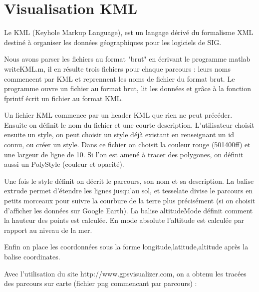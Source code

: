 \documentclass{report}
\begin{document}
\section{Visualisation KML}
Le KML (Keyhole Markup Language), est un langage dérivé du formalisme 
XML destiné à organiser les données géographiques pour les logiciels 
de SIG.

Nous avons parser les fichiers au format "brut" en écrivant le programme
matlab writeKML.m, il en résulte trois fichiers pour chaque parcours :
leurs noms commencent par KML et reprennent 
les noms de fichier du format brut.
Le programme ouvre un fichier au format brut, lit les données et 
grâce à la fonction fprintf écrit un fichier au format KML.
 
Un fichier KML commence par un header KML que rien ne peut précéder. 
Ensuite on définit le nom du fichier et une courte description. 
L’utilisateur choisit ensuite un style, on peut choisir un style 
déjà existant en renseignant un id connu, ou créer un style. 
Dans ce fichier on choisit la couleur rouge (501400ff) 
et une largeur de ligne de 10. Si l’on est amené à tracer des polygones, 
on définit aussi un PolyStyle (couleur et opacité).
 
Une fois le style définit on décrit le parcours, 
son nom et sa description. La balise extrude permet d’étendre les lignes 
jusqu’au sol, et tesselate divise le parcours en petits morceaux 
pour suivre la courbure de la terre plus précisément 
(si on choisit d’afficher les données sur Google Earth). 
La balise altitudeMode définit comment la hauteur 
des points est calculée. 
En mode absolute l’altitude est calculée par rapport au niveau de la mer.
 
Enfin on place les coordonnées sous la forme longitude,latitude,altitude 
après la balise coordinates.

Avec l'utilisation du site http://www.gpsvisualizer.com, on a obtenu
les tracées des parcours sur carte (fichier png commencant par parcours) :
\end{document}
